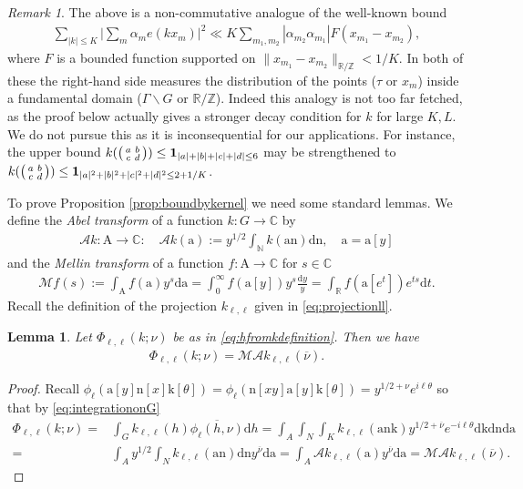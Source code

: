 \documentclass[12pt]{amsart}
\newtheorem{lemma}[theorem]{Lemma}
\theoremstyle{definition}
\theoremstyle{remark}
\newtheorem{remark}{Remark}
\numberwithin{equation}{section}
\newcommand{\A}{\mathcal{A}}
\newcommand{\C}{{\mathbb C}}
\newcommand{\R}{{\mathbb R}}
\newcommand{\Z}{{\mathbb Z}}
\newcommand{\N}{{\mathbb N}}
\newcommand{\1}{{\mathbf 1}}
\renewcommand{\a}{\mathrm{a}}
\newcommand{\n}{\mathrm{n}}
\renewcommand{\k}{\mathrm{k}}
\renewcommand{\d}{\mathrm d}
\renewcommand{\n}{\mathrm{n}}
\begin{document}
\begin{remark}
The above is a non-commutative analogue of the well-known bound
\begin{align*}
  \sum_{|k| \leq K} \bigg| \sum_{m} \alpha_m e( k x_m) \bigg|^2  \ll  K \sum_{m_1,m_2} |\alpha_{m_2} \alpha_{m_1}|F(x_{m_1} -x_{m_2}),
\end{align*}
where $F$ is a bounded function supported on $\|x_{m_1} -x_{m_2} \|_{\R / \Z} < 1/K$. In both of these the right-hand side measures the distribution of the points ($\tau$ or $x_m$) inside a fundamental domain ($\Gamma \backslash G$ or $\R/\Z$). Indeed this analogy is not too far fetched, as the proof below actually gives a stronger decay condition for $k$ for large $K,L$. We do not pursue this as it is inconsequential for our applications. For instance, the upper bound $   k(\smqty(a& b \\ c & d)) \leq \mathbf{1}_{|a|+|b|+|c|+|d| \leq 6}$ may be strengthened to  $   k(\smqty(a& b \\ c & d)) \leq \mathbf{1}_{|a|^2+|b|^2+|c|^2+|d|^2 \leq 2+1/K}$. 
\end{remark}

To prove Proposition \ref{prop:boundbykernel} we need some standard lemmas. We define the \emph{Abel transform} of a function $k:G \to \C$ by
\begin{align*}
 \mathcal{A}k: \mathrm{A} \to \C: \quad   \mathcal{A} k(\a) := y^{1/2} \int_{\N}    k(\a \n) \d \n, \quad \a=\a[y] 
\end{align*}
and the \emph{Mellin transform} of a function $f:\mathrm{A}\to \C$ for $s \in \C$
\begin{align*}
    \mathcal{M} f(s) := \int_\mathrm{A} f(\a) y^s \d \a = \int_0^\infty f(\a[y]) y^s \frac{\d y}{y} =  \int_\R f(\a[e^t]) e^{ts} \d t.  
\end{align*}
Recall the definition of the projection $k_{\ell,\ell}$ given in \eqref{eq:projectionll}.

\begin{lemma} \label{le:mellinabel}
Let $\Phi_{\ell,\ell}(k;\nu)$ be as in \eqref{eq:hfromkdefinition}. Then we have
\begin{align*}
    \Phi_{\ell,\ell}(k;\nu)=\mathcal{M}\A k_{\ell,\ell} (\overline{\nu}).
\end{align*}
\end{lemma}

\begin{proof}
  Recall $\phi_\ell( \a[y] \n[x] \k[\theta]) =\phi_\ell( \n[xy]\a[y]  \k[\theta])  =y^{1/2+\nu}e^{i \ell \theta}$ so that by \eqref{eq:integrationonG} 
    \begin{align*}
        \Phi_{\ell,\ell}(k;\nu) =& \int_G  k_{\ell,\ell}(h) \overline{\phi_{\ell}(h,\nu)} \d h= \int_{A} \int_N \int_K  k_{\ell,\ell}(\a \n \k) y^{1/2+\overline{\nu}}e^{-i \ell \theta}  \d \k \d \n  \d \a \\
        =&  \int_{A} y^{1/2}\int_N k_{\ell,\ell}(\a \n ) \d \n  y^{\overline{\nu}} \d \a=  \int_{A} \mathcal{A}k_{\ell,\ell}(\a) y^{\overline{\nu}} \d \a
        = \mathcal{M} \A k_{\ell,\ell} (\overline{\nu}).
    \end{align*}
\end{proof}
\end{document}
